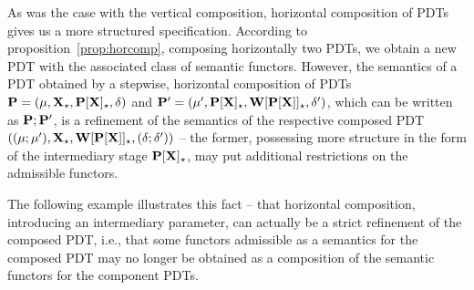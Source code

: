 As was the case with the vertical composition, horizontal composition of PDTs
gives us a more structured specification. 
According to
proposition~\ref{prop:horcomp}, composing horizontally two PDTs, we obtain a
new PDT with the associated class of semantic functors. 
However, the semantics of a PDT obtained by a stepwise, horizontal
composition of PDTs $\thr P=\pdt$ and $\thr
P'=\pdtsp{\mu'}{\delta'}{\thr{P[X]_\cons}}{\thr{W[P[X]]_\cons}}$, 
which can be written as $\thr P;\thr P'$, 
is a
refinement of the semantics of the respective composed PDT 
$\pdtsp{(\mu;\mu')}{(\delta;\delta')}{\thr{X_\cons}}{\thr{W[P[X]]_\cons}}$ --
the former, possessing more structure in the form of the intermediary stage
$\thr{P[X]_\cons}$, may put additional restrictions on the admissible
functors.

The following example illustrates this fact -- that horizontal composition, introducing an
 intermediary parameter, can actually be a strict refinement of the composed
 PDT, i.e., that some functors admissible as a semantics for the composed PDT
 may no longer be obtained as a composition of the semantic functors for the
 component PDTs.

